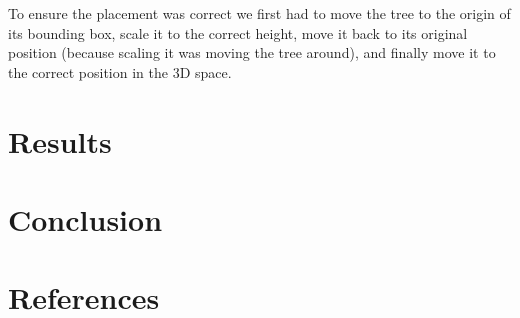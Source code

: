 \documentclass[12pt]{article}
\begin{document}
To ensure the placement was correct we first had to move the tree to the origin
of its bounding box, scale it to the correct height, move it back to its original position
(because scaling it was moving the tree around), and finally move it to the correct position in the 3D space.

\section{Results}


\newpage

\section{Conclusion}


\newpage

\section{References}


\end{document}
